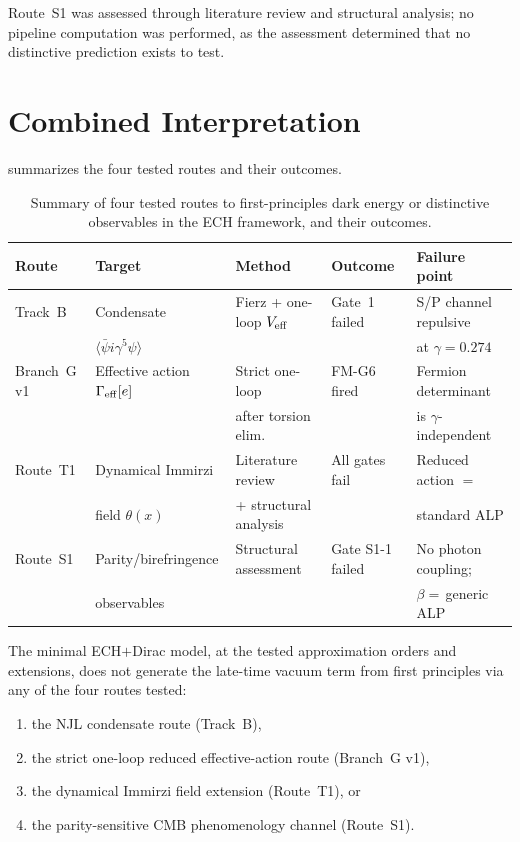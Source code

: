 \documentclass[11pt,letterpaper]{article}
\newcommand{\BI}{\gamma}               %
\newcommand{\Veff}{V_{\rm eff}}
\newcommand{\Gam}{\Gamma_{\rm eff}}
\begin{document}
Route~S1 was assessed through literature review and structural analysis;
no pipeline computation was performed, as the assessment determined that
no distinctive prediction exists to test.


\section{Combined Interpretation}\label{sec:combined}

 summarizes the four tested routes and their outcomes.

\begin{table}[t]
\centering
\caption{Summary of four tested routes to first-principles dark energy or
distinctive observables in the ECH framework, and their outcomes.}
\label{tab:summary}
\small
\begin{tabular}{@{}lllll@{}}
\toprule
Route & Target & Method & Outcome & Failure point \\
\midrule
Track~B & Condensate
  & Fierz + one-loop $\Veff$
  & Gate~1 failed
  & S/P channel repulsive \\
  & $\langle\bar\psi i\gamma^5\psi\rangle$
  & & & at $\BI=0.274$ \\[3pt]
Branch~G v1 & Effective action $\Gam[e]$
  & Strict one-loop
  & FM-G6 fired
  & Fermion determinant \\
  & & after torsion elim.
  &
  & is $\BI$-independent \\[3pt]
Route~T1 & Dynamical Immirzi
  & Literature review
  & All gates fail
  & Reduced action $=$  \\
  & field $\theta(x)$
  & + structural analysis
  &
  & standard ALP \\[3pt]
Route~S1 & Parity/birefringence
  & Structural assessment
  & Gate S1-1 failed
  & No photon coupling; \\
  & observables
  &
  &
  & $\beta=\,$generic ALP \\
\bottomrule
\end{tabular}
\end{table}

The minimal ECH$+$Dirac model, at the tested approximation orders and
extensions, does not generate the late-time vacuum term from first principles
via any of the four routes tested:
\begin{enumerate}[label=(\roman*)]
  \item the NJL condensate route (Track~B),
  \item the strict one-loop reduced effective-action route (Branch~G v1),
  \item the dynamical Immirzi field extension (Route~T1), or
  \item the parity-sensitive CMB phenomenology channel (Route~S1).
\end{enumerate}
\end{document}
